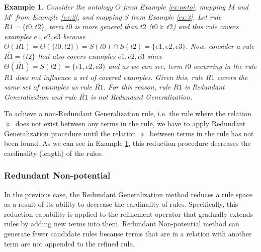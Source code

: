 \documentclass{bmcart}
\newtheorem{example}{Example}
\begin{document}
\begin{example} \label{ex:6}
Consider the ontology $O$ from Example \ref{ex:onto}, mapping $M$ and $M'$ from Example \ref{ex:2}, and mapping $S$ from Example \ref{ex:3}. Let rule $R1=\{t0,t2\}$, term $t0$ is more general than $t2$ ($t0 \succeq t2$) and this rule covers examples $e1, e2, e3$ because $\Theta(R1) = \Theta(\{t0,t2\}) = S(t0) \cap S(t2) = \{e1, e2, e3\}$. Now, consider a rule $\overline{R1} = \{t2\}$ that also covers examples $e1,e2,e3$ since $\Theta(\overline{R1}) = S(t2) = \{e1, e2, e3\}$ and as we can see, term $t0$ occurring in the rule $R1$ does not influence a set of covered examples. Given this, rule $R1$ covers the same set of examples as rule $\overline{R1}$. For this reason, rule $R1$ is Redundant Generalization and rule $\overline{R1}$ is not Redundant Generalization.
\end{example}


To achieve a non-Redundant Generalization rule, i.e. the rule where the relation $\succeq$ does not exist between any terms in the rule, we have to apply Redundant Generalization procedure until the relation $\succeq$  between terms in the rule has not been found.
As we can see in Example \ref{ex:6}, this reduction procedure decreases the cardinality (length) of the rules. 


\subsubsection*{Redundant Non-potential}
In the previous case, the Redundant Generalization method reduces a rule space as a result of its ability to decrease the cardinality of rules. Specifically, this reduction capability is applied to the refinement operator that gradually extends rules by adding new terms into them. Redundant Non-potential method can generate fewer candidate rules because terms that are in a relation with another term are not appended to the refined rule.
\end{document}
